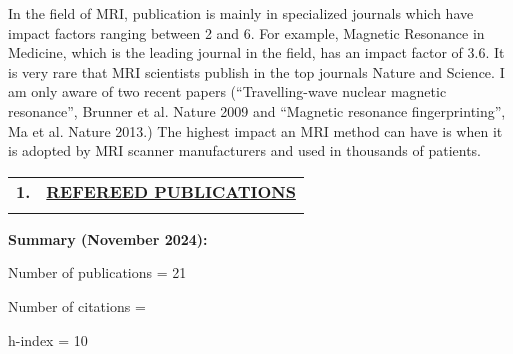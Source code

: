 \documentclass[11pt,notitlepage,english]{report}
\begin{document}
In the field of MRI, publication is mainly in specialized journals which have
impact factors ranging between 2 and 6. For example, Magnetic Resonance in
Medicine, which is the leading journal in the field, has an impact factor of
3.6. It is very rare that MRI scientists publish in the top journals Nature and
Science. I am only aware of two recent papers (“Travelling-wave nuclear
magnetic resonance”, Brunner et al. Nature 2009 and “Magnetic resonance
fingerprinting”, Ma et al. Nature 2013.) The highest impact an MRI method can
have is when it is adopted by MRI scanner manufacturers and used in thousands
of patients.

\begin{tabular}{L{.5cm} L{18.9cm} }
  \\
  \textbf{1.}  & \underline{\textbf{REFEREED PUBLICATIONS}}                                      \\
  \\
\end{tabular}

\textbf{Summary (November 2024):} 

\hspace{1cm} Number of publications = 21

\hspace{1cm} Number of citations = \totalcitations%

\hspace{1cm} h-index = 10

\end{document}
